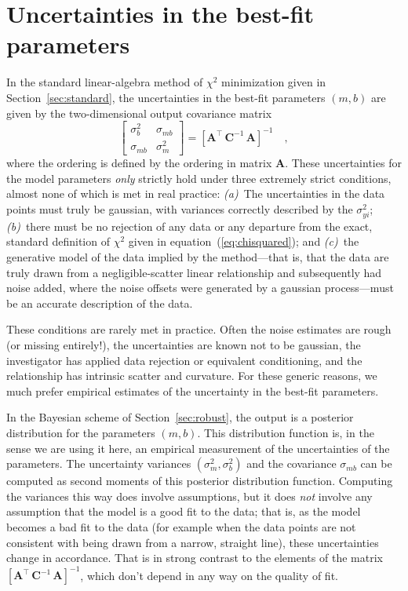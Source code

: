 \documentclass[12pt,twoside]{article}
\newcommand{\sectionname}{Section}
\newcommand{\equationname}{equation}
\newcommand{\mmatrix}[1]{\boldsymbol{#1}}
\newcommand{\inverse}[1]{{#1}^{-1}}
\newcommand{\transpose}[1]{{#1}^{\scriptscriptstyle \top}}
\newcommand{\mA}{\mmatrix{A}}
\newcommand{\mAT}{\transpose{\mA}}
\newcommand{\mC}{\mmatrix{C}}
\newcommand{\mCinv}{\inverse{\mC}}
\begin{document}
\section{Uncertainties in the best-fit parameters}\label{sec:uncertainty}

In the standard linear-algebra method of $\chi^2$ minimization given
in \sectionname~\ref{sec:standard}, the uncertainties in the best-fit
parameters $(m,b)$ are given by the two-dimensional output covariance
matrix
\begin{equation}
\left[\begin{array}{cc}
\sigma_{b}^2 & \sigma_{mb} \\
\sigma_{mb} & \sigma_{m}^2
\end{array}\right] = \inverse{\left[\mAT\,\mCinv\,\mA\right]} \quad ,
\end{equation}
where the ordering is defined by the ordering in matrix $\mA$.  These
uncertainties for the model parameters \emph{only} strictly hold under
three extremely strict conditions, almost none of which is met in real
practice: \textsl{(a)}~The uncertainties in the data points must truly
be gaussian, with variances correctly described by the
$\sigma_{yi}^2$; \textsl{(b)}~there must be no rejection of any data
or any departure from the exact, standard definition of $\chi^2$ given
in \equationname~(\ref{eq:chisquared}); and \textsl{(c)}~the
generative model of the data implied by the method---that is, that the
data are truly drawn from a negligible-scatter linear relationship and
subsequently had noise added, where the noise offsets were generated
by a gaussian process---must be an accurate description of the data.

These conditions are rarely met in practice.  Often the noise
estimates are rough (or missing entirely!), the uncertainties are
known not to be gaussian, the investigator has applied data rejection
or equivalent conditioning, and the relationship has intrinsic scatter
and curvature.  For these generic reasons, we much prefer empirical
estimates of the uncertainty in the best-fit parameters.

In the Bayesian scheme of \sectionname~\ref{sec:robust}, the output is
a posterior distribution for the parameters $(m,b)$.  This
distribution function is, in the sense we are using it here, an
empirical measurement of the uncertainties of the parameters.  The
uncertainty variances $(\sigma_m^2,\sigma_b^2)$ and the covariance
$\sigma_{mb}$ can be computed as second moments of this posterior
distribution function.  Computing the variances this way does involve
assumptions, but it does \emph{not} involve any assumption that the
model is a good fit to the data; that is, as the model becomes a bad
fit to the data (for example when the data points are not consistent
with being drawn from a narrow, straight line), these uncertainties
change in accordance.  That is in strong contrast to the elements of
the matrix $\inverse{\left[\mAT\,\mCinv\,\mA\right]}$, which don't
depend in any way on the quality of fit.
\end{document}
